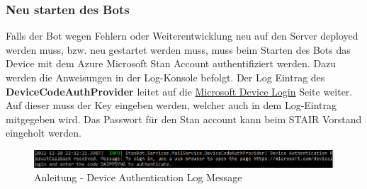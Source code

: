 \documentclass[a4paper, table]{article}
\begin{document}
\subsubsection{Neu starten des Bots}

Falls der Bot wegen Fehlern oder Weiterentwicklung neu auf den Server deployed werden muss, \gls{bzw.} neu gestartet werden muss,
muss beim Starten des Bots das Device mit dem Azure Microsoft Stan Account authentifiziert werden.
Dazu werden die Anweisungen in der Log-Konsole befolgt.
Der Log Eintrag des \textbf{DeviceCodeAuthProvider} leitet auf die \href{https://microsoft.com/devicelogin}{Microsoft Device Login} Seite weiter.
Auf dieser muss der Key eingeben werden, welcher auch in dem Log-Eintrag mitgegeben wird.
Das Passwort für den Stan account kann beim STAIR Vorstand eingeholt werden.

\begin{figure}[h]
    \centering
    \hspace*{-2cm}
    \includegraphics[width=1.3\textwidth]{img/Tut_deviceAuthLog.png}
    \caption{Anleitung - Device Authentication Log Message}
    \label{fig:tutorial-device-auth-log}
\end{figure}
\end{document}

